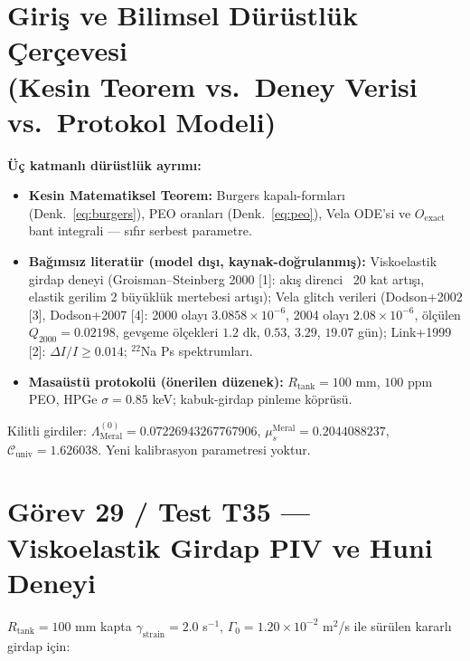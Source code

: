 \documentclass[12pt,a4paper]{article}
\begin{document}
\section[Giriş ve Bilimsel Dürüstlük Çerçevesi]{Giriş ve Bilimsel Dürüstlük Çerçevesi \\ (Kesin Teorem vs.\ Deney Verisi vs.\ Protokol Modeli)}

\textbf{Üç katmanlı dürüstlük ayrımı:}
\begin{itemize}
    \item \textbf{Kesin Matematiksel Teorem:} Burgers kapalı-formları
    (Denk.~\ref{eq:burgers}), PEO oranları (Denk.~\ref{eq:peo}), Vela ODE'si ve
    $O_{\mathrm{exact}}$ bant integrali --- sıfır serbest parametre.
    \item \textbf{Bağımsız literatür (model dışı, kaynak-doğrulanmış):}
    Viskoelastik girdap deneyi (Groisman--Steinberg 2000 [1]: akış direnci
    ~20 kat artışı, elastik gerilim 2 büyüklük mertebesi artışı);
    Vela glitch verileri (Dodson+2002 [3], Dodson+2007 [4]: 2000 olayı
    $3.0858\times10^{-6}$, 2004 olayı $2.08\times10^{-6}$, ölçülen
    $Q_{2000}=0.02198$, gevşeme ölçekleri $1.2$ dk, $0.53$, $3.29$, $19.07$ gün);
    Link+1999 [2]: $\Delta I/I\ge 0.014$; $^{22}$Na Ps spektrumları.
    \item \textbf{Masaüstü protokolü (önerilen düzenek):} $R_{\mathrm{tank}}=100$
    mm, $100$ ppm PEO, HPGe $\sigma=0.85$ keV; kabuk-girdap pinleme köprüsü.
\end{itemize}
Kilitli girdiler: $\Lambda_{\mathrm{Meral}}^{(0)} = 0.07226943267767906$,
$\mu_s^{\mathrm{Meral}} = 0.2044088237$,
$\mathcal{C}_{\mathrm{univ}} = 1.626038$. Yeni kalibrasyon parametresi yoktur.

\section{Görev 29 / Test T35 --- Viskoelastik Girdap PIV ve Huni Deneyi}

$R_{\mathrm{tank}}=100$ mm kapta $\gamma_{\mathrm{strain}}=2.0$ s$^{-1}$,
$\Gamma_0=1.20\times 10^{-2}$ m$^2$/s ile sürülen kararlı girdap için:
\end{document}
